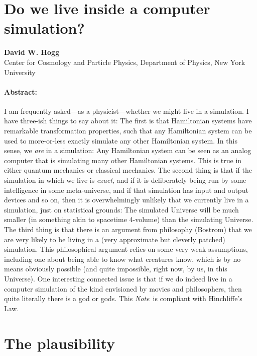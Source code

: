 \documentclass[12pt,letterpaper]{article}
\newcommand{\documentname}{\textsl{Note}}
\begin{document}
\section*{Do we live inside a computer simulation?}

\noindent
\textbf{David W. Hogg}\\
{\footnotesize{Center for Cosmology and Particle Physics, Department of Physics, New York University}}

\paragraph{Abstract:}
I am frequently asked---as a physicist---whether we might live in a simulation.
I have three-ish things to say about it:
The first is that Hamiltonian systems have remarkable transformation
properties, such that any Hamiltonian system can be used to
more-or-less exactly simulate any other Hamiltonian system.
In this sense, we \emph{are} in a simulation:
Any Hamiltonian system can be seen as an analog computer that is
simulating many other Hamiltonian systems.
This is true in either quantum mechanics or classical mechanics.
The second thing is that if the simulation in which we live is
\emph{exact}, and if it is deliberately being run by some intelligence
in some meta-universe, and if that simulation has input and output
devices and so on, then it is overwhelmingly unlikely that we
currently live in a simulation, just on statistical grounds:
The simulated Universe will be much smaller (in something akin to spacetime 4-volume)
than the simulating Universe.
The third thing is that there is an argument from philosophy (Bostrom)
that we are very likely to be living in a (very approximate but
cleverly patched) simulation.
This philosophical argument relies on some very weak assumptions,
including one about being able to know what creatures know, which is
by no means obviously possible (and quite impossible, right now, by
us, in this Universe).
One interesting connected issue is that if we do indeed live in a
computer simulation of the kind envisioned by movies and philosophers,
then quite literally there is a god or gods.
This \documentname\ is compliant with Hinchliffe's Law.

\section{The plausibility}
\end{document}
